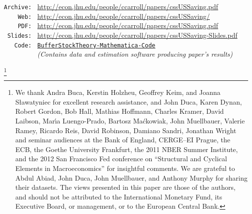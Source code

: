 \documentclass[titlepage]{\econtex}
\begin{document}
\parbox{\textwidth}{
\begin{center}
\begin{tabbing}
\texttt{Archive:~} \= \= \url{http://econ.jhu.edu/people/ccarroll/papers/cssUSSaving.pdf} \kill \\  %
\texttt{~~~~Web:~} \> \> \url{http://econ.jhu.edu/people/ccarroll/papers/cssUSSaving/} \\
\texttt{~~~~PDF:~} \> \> \url{http://econ.jhu.edu/people/ccarroll/papers/cssUSSaving.pdf} \\
\texttt{~Slides:~} \> \> \url{http://econ.jhu.edu/people/ccarroll/papers/cssUSSaving-Slides.pdf} \\
\texttt{~~~Code:~} \> \> \href{http://econ.jhu.edu/people/ccarroll/papers/cssUSSaving/Code/Mathematica-ReadMe.txt}{\texttt{BufferStockTheory-Mathematica-Code}} \\
\texttt{~~~~~~~~~} \> \> {\it (Contains data and estimation software producing paper's results)}
\end{tabbing}
\end{center}
}

\begin{authorsinfo}
\end{authorsinfo}

\thanks{We thank Andra Buca, Kerstin Holzheu, Geoffrey Keim, and Joanna S{\l}awatyniec for excellent research assistance, and John Duca, Karen Dynan, Robert Gordon, Bob Hall, Mathias Hoffmann, Charles Kramer, David Laibson, Mar\'\i a Luengo-Prado, Bartosz Ma\'ckowiak, John Muellbauer, Valerie Ramey, Ricardo Reis, David Robinson, Damiano Sandri, Jonathan Wright and seminar audiences at the Bank of England, CERGE--EI Prague, the ECB, the Goethe University Frankfurt, the 2011 NBER Summer Institute, and the 2012 San Francisco Fed conference on ``Structural and Cyclical Elements in Macroeconomics'' for insightful comments. We are grateful to Abdul Abiad, John Duca, John Muellbauer, and Anthony Murphy for sharing their datasets. The views presented in this paper are those of the authors, and should not be attributed to the International Monetary Fund, its Executive Board, or management, or to the European Central Bank.}
\end{document}

